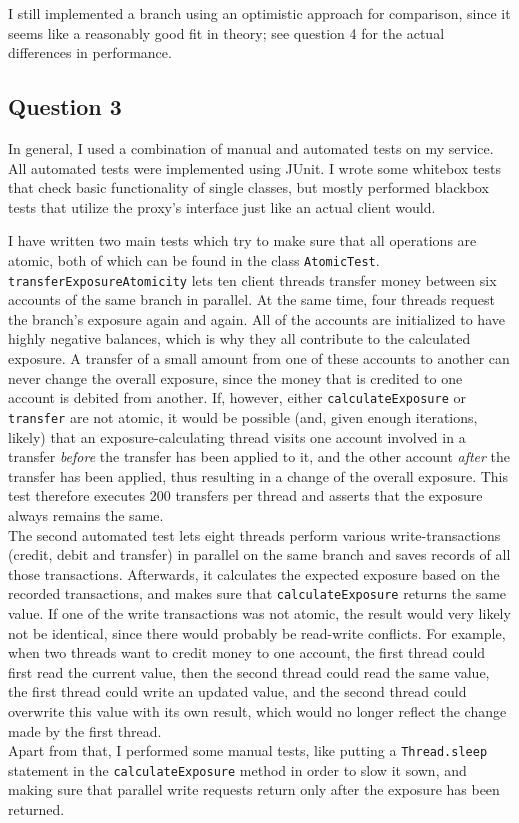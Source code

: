 \documentclass[12pt,a4paper,fleqn]{article}
\begin{document}
I still implemented a branch using an optimistic approach for comparison, since it seems like a reasonably good fit in theory; see question 4 for the actual differences in performance.

\subsection*{Question 3}
\label{sec:pq3}
In general, I used a combination of manual and automated tests on my service. All automated tests were implemented using JUnit. I wrote some whitebox tests that check basic functionality of single classes, but mostly performed blackbox tests that utilize the proxy's interface just like an actual client would. 

I have written two main tests which try to make sure that all operations are atomic, both of which can be found in the class \texttt{AtomicTest}. \texttt{transferExposureAtomicity} lets ten client threads transfer money between six accounts of the same branch in parallel. At the same time, four threads request the branch's exposure again and again. All of the accounts are initialized to have highly negative balances, which is why they all contribute to the calculated exposure. A transfer of a small amount from one of these accounts to another can never change the overall exposure, since the money that is credited to one account is debited from another. If, however, either \texttt{calculateExposure} or \texttt{transfer} are not atomic, it would be possible (and, given enough iterations, likely) that an exposure-calculating thread visits one account involved in a transfer \emph{before} the transfer has been applied to it, and the other account \emph{after} the transfer has been applied, thus resulting in a change of the overall exposure. This test therefore executes 200 transfers per thread and asserts that the exposure always remains the same. \\The second automated test lets eight threads perform various write-transactions (credit, debit and transfer) in parallel on the same branch and saves records of all those transactions. Afterwards, it calculates the expected exposure based on the recorded transactions, and makes sure that \texttt{calculateExposure} returns the same value. If one of the write transactions was not atomic, the result would very likely not be identical, since there would probably be read-write conflicts. For example, when two threads want to credit money to one account, the first thread could first read the current value, then the second thread could read the same value, the first thread could write an updated value, and the second thread could overwrite this value with its own result, which would no longer reflect the change made by the first thread. \\Apart from that, I performed some manual tests, like putting a \texttt{Thread.sleep} statement in the \texttt{calculateExposure} method in order to slow it sown, and making sure that parallel write requests return only after the exposure has been returned.
\end{document}
